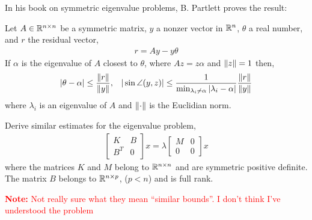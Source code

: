 \documentclass[10pt]{article}
\newcommand{\note}[1]{\textcolor{red}{\textbf{Note:} #1}}
\begin{document}
\begin{problem}
In his book on symmetric eigenvalue problems, B. Partlett proves the
result:

\hrulefill

    Let \( A\in\mathbb{R}^{n\times n} \) be a symmetric matrix, \( y \) a nonzer vector in \( \mathbb{R}^n \), \( \theta \) a real number, and \( r \) the residual vector,
    \begin{align*}
        r = Ay - y\theta
    \end{align*}
    If \( \alpha \) is the eigenvalue of \( A \) closest to \( \theta \), where \( Az = z\alpha \) and \( \left\lVert z\right\rVert=1 \) then,
    \begin{align*}
        |\theta-\alpha| \leq \frac{\left\lVert r\right\rVert}{\left\lVert y\right\rVert}, && |\sin \angle (y,z) |\leq \frac{1}{\min_{\lambda_i\neq \alpha} | \lambda_i-\alpha|} \frac{\left\lVert r\right\rVert}{\left\lVert y\right\rVert}
    \end{align*}
    where \( \lambda_i \) is an eigenvalue of \( A \) and \( \left\lVert\cdot\right\rVert \) is the Euclidian norm.

    \hrulefill
    
    Derive similar estimates for the eigenvalue problem,
    \begin{align*}
        \left[\begin{array}{cc}K & B \\ B^T & 0\end{array}\right] x = \lambda \left[\begin{array}{cc}M & 0 \\ 0 & 0\end{array}\right] x
    \end{align*}
    where the matrices \( K \) and \( M \) belong to \( \mathbb{R}^{n\times n} \) and are symmetric positive definite. The matrix \( B \) belongs to \( \mathbb{R}^{n\times p} \), (\( p<n \)) and is full rank.

\end{problem}

\begin{solution}[Solution]
\note{Not really sure what they mean ``similar bounds''. I don't think I've understood the problem} 
\end{solution}
\end{document}
